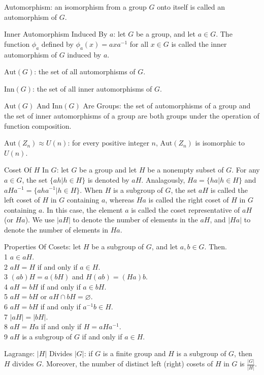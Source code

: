 Automorphism: an isomorphism from a group $G$ onto itself is called an automorphism of $G$.

Inner Automorphism Induced By $a$: let $G$ be a group, and let $a \in G$. The function $\phi_a$ defined by $\phi_a (x) = axa^{-1}$ for all $x \in G$ is called the inner automorphism of $G$ induced by $a$.

$\text{Aut}(G)$: the set of all automorphisms of $G$.

$\text{Inn}(G)$: the set of all inner automorphisms of $G$.

$\text{Aut}(G)$ And $\text{Inn}(G)$ Are Groups: the set of automorphisms of a group and the set of inner automorphisms of a group are both groups under the operation of function composition.

$\text{Aut}(Z_n) \approx U(n)$: for every positive integer $n$, $\text{Aut}(Z_n)$ is isomorphic to $U(n)$.

Coset Of $H$ In $G$: let $G$ be a group and let $H$ be a nonempty subset of $G$. For any $a \in G$, the set $\{ ah | h \in H \}$ is denoted by $aH$. Analagously, $Ha = \{ha | h \in H \}$ and $aHa^{-1} = \{aha^{-1} | h \in H \}$. When $H$ is a subgroup of $G$, the set $aH$ is called the left coset of $H$ in $G$ containing $a$, whereas $Ha$ is called the right coset of $H$ in $G$ containing $a$. In this case, the element $a$ is called the coset representative of $aH$ (or $Ha$). We use $|aH|$ to denote the number of elements in the $aH$, and $|Ha|$ to denote the number of elements in $Ha$.

Properties Of Cosets: let $H$ be a subgroup of $G$, and let $a,b \in G$. Then. \\
1 $a \in aH$. \\
2 $aH=H$ if and only if $a \in H$. \\
3 $(ab)H=a(bH)$ and $H(ab)=(Ha)b$. \\
4 $aH=bH$ if and only if $a \in bH$. \\
5 $aH=bH$ or $aH \cap bH = \varnothing$. \\
6 $aH=bH$ if and only if $a^{-1}b \in H$. \\
7 $|aH|=|bH|$. \\
8 $aH=Ha$ if and only if $H=aHa^{-1}$. \\
9 $aH$ is a subgroup of $G$ if and only if $a \in H$.

Lagrange: $|H|$ Divides $|G|$: if $G$ is a finite group and $H$ is a subgroup of $G$, then $H$ divides $G$. Moreover, the number of distinct left (right) cosets of $H$ in $G$ is $\frac{|G|}{|H|}$.

